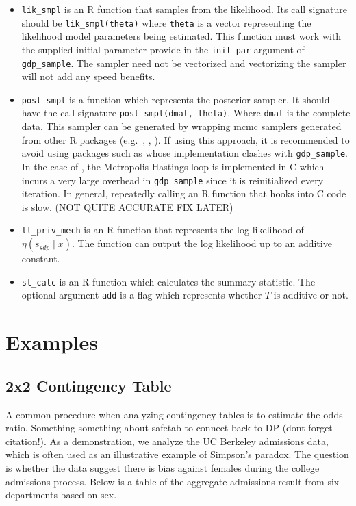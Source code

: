 \begin{itemize}
\item
  \texttt{lik\_smpl} is an R function that samples from the likelihood. Its
  call signature should be \texttt{lik\_smpl(theta)} where \texttt{theta} is a vector
  representing the likelihood model parameters being estimated. This function
  must work with the supplied initial parameter provide in the \texttt{init\_par}
  argument of \texttt{gdp\_sample}. The sampler need not be vectorized and vectorizing
  the sampler will not add any speed benefits.
\item
  \texttt{post\_smpl} is a function which represents the posterior sampler. It should
  have the call signature \texttt{post\_smpl(dmat,\ theta)}. Where \texttt{dmat} is the
  complete data. This sampler can be generated by wrapping mcmc samplers generated from other R packages
  (e.g.~, , ).
  If using this approach, it is recommended to avoid using packages such as 
  whose implementation clashes with \texttt{gdp\_sample}. In the case of ,
  the Metropolis-Hastings loop is implemented in C which incurs a very large overhead
  in \texttt{gdp\_sample} since it is reinitialized every iteration. In general, repeatedly calling
  an R function that hooks into C code is slow. (NOT QUITE ACCURATE FIX LATER)
\item
  \texttt{ll\_priv\_mech} is an R function that represents the log-likelihood of
  \(\eta(s_{sdp} \mid x)\). The function can output the log likelihood
  up to an additive constant.
\item
  \texttt{st\_calc} is an R function which calculates the summary statistic. The optional
  argument \texttt{add} is a flag which represents whether \(T\) is additive or not.
\end{itemize}

\hypertarget{examples}{%
\section{Examples}\label{examples}}

\hypertarget{x2-contingency-table}{%
\subsection{2x2 Contingency Table}\label{x2-contingency-table}}

A common procedure when analyzing contingency tables is to estimate the
odds ratio. Something something about safetab to connect back to DP (dont forget citation!).
As a demonstration, we analyze the UC Berkeley admissions data, which is often
used as an illustrative example of Simpson's paradox. The question is whether
the data suggest there is bias against females during the college admissions
process. Below is a table of the aggregate admissions result from six departments based on sex.

